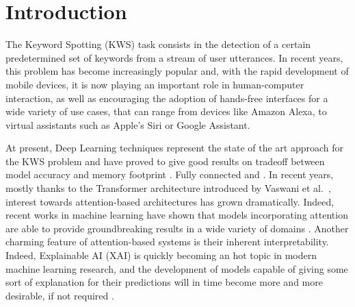 
\section{Introduction}
\label{sec:introduction}
	
The Keyword Spotting (KWS) task consists in the detection of a certain predetermined set of keywords from a stream of user utterances. In recent years, this problem has become increasingly popular and, with the rapid development of mobile devices, it is now playing an important role in human-computer interaction, as well as encouraging the adoption of hands-free interfaces for a wide variety of use cases, that can range from  devices like Amazon Alexa, to virtual assistants such as Apple's Siri or Google Assistant. 

At present, Deep Learning techniques represent the state of the art approach for the KWS problem and have proved to give good results on tradeoff between model accuracy and memory footprint\cite{dnns2014chen} \cite{convnns2015sainath} \cite{streamingkws2020Rybakov}. Fully connected  and  \cite{deepreslearning2018tang} \cite{convnns2015sainath} %
\cite{mittermaier2020small} \cite{choi2019temporal}. In recent years, mostly thanks to the Transformer architecture introduced by Vaswani et al.~\cite{attentionisall2017vaswani}, interest towards attention-based architectures has grown dramatically. Indeed, recent works in machine learning have shown that models incorporating attention are able to provide groundbreaking results in a wide variety of domains \cite{vit2020Dosovitskiy} \cite{touvron2021training} \cite{gulati2020conformer} \cite{kumar2021colorization} \cite{Devlin2019BERTPO}. Another charming feature of attention-based systems is their inherent interpretability. Indeed, Explainable AI (XAI) is quickly becoming an hot topic in modern machine learning research, and the development of models capable of giving some sort of explanation for their predictions  will in time become more and more desirable, if not required \cite{gdpr2017}.

